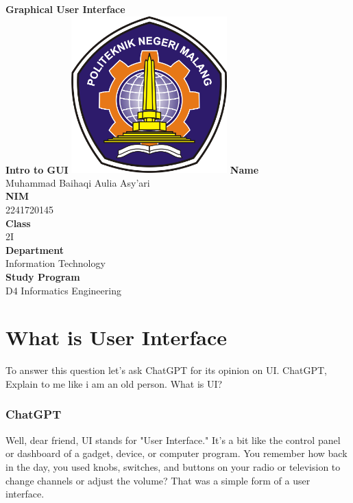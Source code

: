 \documentclass[12pt,titlepage]{article}
\newcommand{\vSubject}{Graphical User Interface}
\newcommand{\vSubtitle}{Intro to GUI}
\newcommand{\vName}{Muhammad Baihaqi Aulia Asy'ari}
\newcommand{\vNIM}{2241720145}
\newcommand{\vClass}{2I}
\newcommand{\vDepartment}{Information Technology}
\newcommand{\vStudyProgram}{D4 Informatics Engineering}
\begin{document}
\begin{titlepage}
    \centering
    \vfill
    {\bfseries\LARGE
        \vSubject\\
        \vskip0.25cm
        \vSubtitle
    }
    \vfill
    \includegraphics[width=6cm]{images/polinema-logo.png}
    \vfill
    {
        \textbf{Name}\\
        \vName\\
        \vskip0.5cm
        \textbf{NIM}\\
        \vNIM\\
        \vskip0.5cm
        \textbf{Class}\\
        \vClass\\
        \vskip0.5cm
        \textbf{Department}\\
        \vDepartment\\
        \vskip0.5cm
        \textbf{Study Program}\\
        \vStudyProgram
    }
\end{titlepage}

\newpage

\section{What is User Interface}
To answer this question let's ask ChatGPT for its opinion on UI. ChatGPT, Explain to me like i am an old person. What is UI?

\subsubsection*{ChatGPT}
Well, dear friend, UI stands for "User Interface." It's a bit like the control panel or dashboard of a gadget, device, or computer program. You remember how back in the day, you used knobs, switches, and buttons on your radio or television to change channels or adjust the volume? That was a simple form of a user interface.
\end{document}
